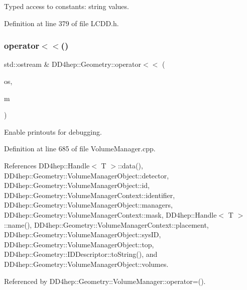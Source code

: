 Typed access to constants\+: string values. 



Definition at line 379 of file L\+C\+D\+D.\+h.

\hypertarget{namespace_d_d4hep_1_1_geometry_a3e162786678e79867327c71e9699ac71}{}\label{namespace_d_d4hep_1_1_geometry_a3e162786678e79867327c71e9699ac71} 
\subsubsection{\texorpdfstring{operator$<$$<$()}{operator<<()}}
{\footnotesize\ttfamily std\+::ostream \& D\+D4hep\+::\+Geometry\+::operator$<$$<$ (\begin{DoxyParamCaption}\item[{std\+::ostream \&}]{os,  }\item[{const \hyperlink{class_d_d4hep_1_1_geometry_1_1_volume_manager}{Volume\+Manager} \&}]{m }\end{DoxyParamCaption})}



Enable printouts for debugging. 



Definition at line 685 of file Volume\+Manager.\+cpp.



References D\+D4hep\+::\+Handle$<$ T $>$\+::data(), D\+D4hep\+::\+Geometry\+::\+Volume\+Manager\+Object\+::detector, D\+D4hep\+::\+Geometry\+::\+Volume\+Manager\+Object\+::id, D\+D4hep\+::\+Geometry\+::\+Volume\+Manager\+Context\+::identifier, D\+D4hep\+::\+Geometry\+::\+Volume\+Manager\+Object\+::managers, D\+D4hep\+::\+Geometry\+::\+Volume\+Manager\+Context\+::mask, D\+D4hep\+::\+Handle$<$ T $>$\+::name(), D\+D4hep\+::\+Geometry\+::\+Volume\+Manager\+Context\+::placement, D\+D4hep\+::\+Geometry\+::\+Volume\+Manager\+Object\+::sys\+ID, D\+D4hep\+::\+Geometry\+::\+Volume\+Manager\+Object\+::top, D\+D4hep\+::\+Geometry\+::\+I\+D\+Descriptor\+::to\+String(), and D\+D4hep\+::\+Geometry\+::\+Volume\+Manager\+Object\+::volumes.



Referenced by D\+D4hep\+::\+Geometry\+::\+Volume\+Manager\+::operator=().

\hypertarget{namespace_d_d4hep_1_1_geometry_a4acfd853c88ea713e8ae04ad1967f59c}{}\label{namespace_d_d4hep_1_1_geometry_a4acfd853c88ea713e8ae04ad1967f59c} 
